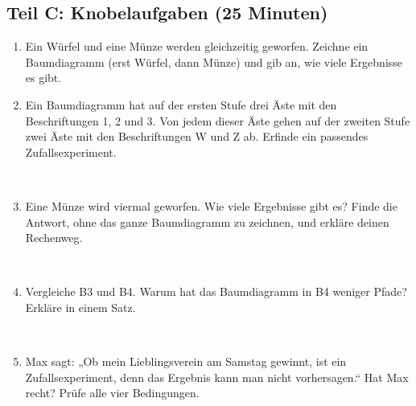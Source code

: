 \subsection*{Teil C: Knobelaufgaben (25 Minuten)}

\begin{enumerate}[label=\textbf{C\arabic*}]

    \item Ein Würfel und eine Münze werden gleichzeitig geworfen. Zeichne ein Baumdiagramm (erst Würfel, dann Münze) und gib an, wie viele Ergebnisse es gibt.

    \vspace{5cm}

    \item Ein Baumdiagramm hat auf der ersten Stufe drei Äste mit den Beschriftungen 1, 2 und 3. Von jedem dieser Äste gehen auf der zweiten Stufe zwei Äste mit den Beschriftungen W und Z ab. Erfinde ein passendes Zufallsexperiment.

    \vspace{0.3cm}
    \antwortlinie{\linewidth}\\[0.4cm]
    \antwortlinie{\linewidth}

    \vspace{0.6cm}

    \item Eine Münze wird viermal geworfen. Wie viele Ergebnisse gibt es? Finde die Antwort, ohne das ganze Baumdiagramm zu zeichnen, und erkläre deinen Rechenweg.

    \vspace{0.3cm}
    \antwortlinie{\linewidth}\\[0.4cm]
    \antwortlinie{\linewidth}

    \vspace{0.6cm}

    \item Vergleiche B3 und B4. Warum hat das Baumdiagramm in B4 weniger Pfade? Erkläre in einem Satz.

    \vspace{0.3cm}
    \antwortlinie{\linewidth}\\[0.4cm]
    \antwortlinie{\linewidth}

    \vspace{0.6cm}

    \item Max sagt: „Ob mein Lieblingsverein am Samstag gewinnt, ist ein Zufallsexperiment, denn das Ergebnis kann man nicht vorhersagen.“ Hat Max recht? Prüfe alle vier Bedingungen.

    \vspace{0.3cm}
    \antwortlinie{\linewidth}\\[0.4cm]
    \antwortlinie{\linewidth}\\[0.4cm]
    \antwortlinie{\linewidth}

\end{enumerate}
